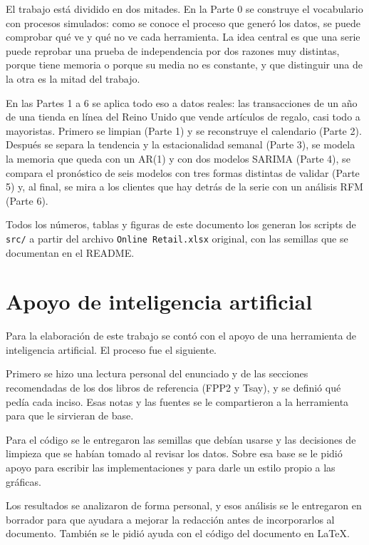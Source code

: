 \documentclass[11pt,letterpaper]{article}
\newcommand{\code}[1]{\texttt{#1}}
\begin{document}
El trabajo está dividido en dos mitades. En la Parte 0 se construye el
vocabulario con procesos simulados: como se conoce el proceso que generó los
datos, se puede comprobar qué ve y qué no ve cada herramienta. La idea central
es que una serie puede reprobar una prueba de independencia por dos razones
muy distintas, porque tiene memoria o porque su media no es constante, y que
distinguir una de la otra es la mitad del trabajo.

En las Partes 1 a 6 se aplica todo eso a datos reales: las transacciones de
un año de una tienda en línea del Reino Unido que vende artículos de regalo,
casi todo a mayoristas. Primero se limpian (Parte 1) y se reconstruye el
calendario (Parte 2). Después se separa la tendencia y la estacionalidad
semanal (Parte 3), se modela la memoria que queda con un AR(1) y con dos
modelos SARIMA (Parte 4), se compara el pronóstico de seis modelos con tres
formas distintas de validar (Parte 5) y, al final, se mira a los clientes que
hay detrás de la serie con un análisis RFM (Parte 6).

Todos los números, tablas y figuras de este documento los generan los scripts
de \code{src/} a partir del archivo \code{Online Retail.xlsx} original, con
las semillas que se documentan en el README.

\section{Apoyo de inteligencia artificial}

Para la elaboración de este trabajo se contó con el apoyo de una herramienta
de inteligencia artificial. El proceso fue el siguiente.

Primero se hizo una lectura personal del enunciado y de las secciones
recomendadas de los dos libros de referencia (FPP2 y Tsay), y se definió qué
pedía cada inciso. Esas notas y las fuentes se le compartieron a la
herramienta para que le sirvieran de base.

Para el código se le entregaron las semillas que debían usarse y las
decisiones de limpieza que se habían tomado al revisar los datos. Sobre esa base se le pidió apoyo
para escribir las implementaciones y para darle un estilo propio a las
gráficas.

Los resultados se analizaron de forma personal, y esos análisis se le
entregaron en borrador para que ayudara a mejorar la redacción antes de
incorporarlos al documento. También se le pidió ayuda con el código del
documento en \LaTeX.
\end{document}
